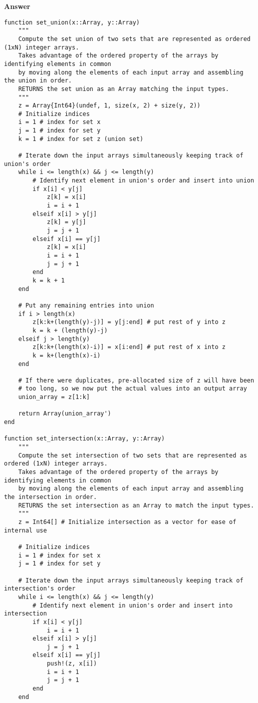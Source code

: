\documentclass[8pt]{article}
\begin{document}
\textbf{Answer} 
\begin{verbatim}
function set_union(x::Array, y::Array)
    """
    Compute the set union of two sets that are represented as ordered (1xN) integer arrays.
    Takes advantage of the ordered property of the arrays by identifying elements in common
    by moving along the elements of each input array and assembling the union in order. 
    RETURNS the set union as an Array matching the input types.
    """
    z = Array{Int64}(undef, 1, size(x, 2) + size(y, 2))
    # Initialize indices
    i = 1 # index for set x
    j = 1 # index for set y
    k = 1 # index for set z (union set)

    # Iterate down the input arrays simultaneously keeping track of union's order
    while i <= length(x) && j <= length(y)
        # Identify next element in union's order and insert into union
        if x[i] < y[j]
            z[k] = x[i]
            i = i + 1
        elseif x[i] > y[j]
            z[k] = y[j]
            j = j + 1
        elseif x[i] == y[j]
            z[k] = x[i]
            i = i + 1
            j = j + 1
        end
        k = k + 1
    end
    
    # Put any remaining entries into union
    if i > length(x)
        z[k:k+(length(y)-j)] = y[j:end] # put rest of y into z
        k = k + (length(y)-j)
    elseif j > length(y)
        z[k:k+(length(x)-i)] = x[i:end] # put rest of x into z
        k = k+(length(x)-i)
    end

    # If there were duplicates, pre-allocated size of z will have been 
    # too long, so we now put the actual values into an output array
    union_array = z[1:k]

    return Array(union_array')
end

function set_intersection(x::Array, y::Array)
    """
    Compute the set intersection of two sets that are represented as ordered (1xN) integer arrays.
    Takes advantage of the ordered property of the arrays by identifying elements in common
    by moving along the elements of each input array and assembling the intersection in order. 
    RETURNS the set intersection as an Array to match the input types.
    """
    z = Int64[] # Initialize intersection as a vector for ease of internal use

    # Initialize indices
    i = 1 # index for set x
    j = 1 # index for set y

    # Iterate down the input arrays simultaneously keeping track of intersection's order
    while i <= length(x) && j <= length(y)
        # Identify next element in union's order and insert into intersection
        if x[i] < y[j]
            i = i + 1
        elseif x[i] > y[j]
            j = j + 1
        elseif x[i] == y[j]
            push!(z, x[i])
            i = i + 1
            j = j + 1
        end
    end


\end{verbatim}
\end{document}
